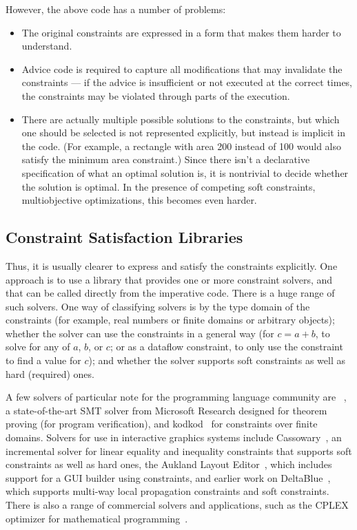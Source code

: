 However, the above code has a number of problems:
\begin{itemize}
\item The original constraints are expressed in a form that makes them
  harder to understand.
\item Advice code is required to capture all modifications that may
  invalidate the constraints --- if the advice is insufficient or not
  executed at the correct times, the constraints may be violated
  through parts of the execution.
\item There are actually multiple possible solutions to the
  constraints, but which one should be selected is not represented
  explicitly, but instead is implicit in the code.  (For example, a
  rectangle with area 200 instead of 100 would also satisfy the
  minimum area constraint.)  Since there isn't a declarative
  specification of what an optimal solution is, it is nontrivial to
  decide whether the solution is optimal. In the presence of competing
  soft constraints, \ie multiobjective optimizations, this becomes
  even harder.
\end{itemize}

\subsection{Constraint Satisfaction Libraries}

Thus, it is usually clearer to express and satisfy the constraints
explicitly.  One approach is to use a library that provides one or
more constraint solvers, and that can be called directly from the
imperative code.  There is a huge range of such solvers.  One way of
classifying solvers is by the type domain of the constraints (for
example, real numbers or finite domains or arbitrary objects); whether
the solver can use the constraints in a general way (\eg for $c=a+b$,
to solve for any of $a$, $b$, or $c$; or as a dataflow constraint, \ie
to only use the constraint to find a value for $c$); and whether the
solver supports soft constraints as well as hard (required) ones.

A few solvers of particular note for the programming language community
are \zthree~\cite{de2008z3}, a state-of-the-art SMT solver from
Microsoft Research designed for theorem proving (\eg for program
verification), and kodkod~\cite{torlak2007kodkod} for constraints over
finite domains.  Solvers for use in interactive graphics systems include
Cassowary~\cite{badros-tochi-2001}, an incremental solver for linear
equality and inequality constraints that supports soft constraints as
well as hard ones, the Aukland Layout Editor~\cite{lutteroth2008end},
which includes support for a GUI builder using constraints, and
earlier work on DeltaBlue~\cite{freeman-benson-phoenix-1989}, which
supports multi-way local propagation constraints and soft constraints.
There is also a range of commercial solvers and applications, such
as the CPLEX optimizer for mathematical
programming~\cite{optimization1993using}.

